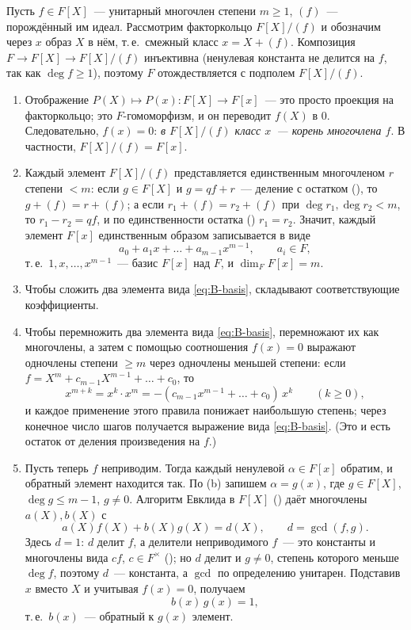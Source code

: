 Пусть $f\in F[X]$~--- унитарный многочлен степени $m\ge1$, $(f)$~--- порождённый им идеал. Рассмотрим факторкольцо
$F[X]/(f)$ и обозначим через $x$ образ $X$ в нём, т.\,е.\ смежный класс $x=X+(f)$. Композиция $F\to F[X]\to F[X]/(f)$
инъективна (ненулевая константа не делится на $f$, так как $\deg f\ge1$), поэтому $F$ отождествляется с подполем
$F[X]/(f)$.
\begin{enumerate}[label=(\alph*),leftmargin=*]
\item Отображение $P(X)\mapsto P(x)\colon F[X]\to F[x]$~--- это просто проекция на факторкольцо; это $F$-гомоморфизм, и
он переводит $f(X)$ в $0$. Следовательно, $f(x)=0$: \emph{в $F[X]/(f)$ класс $x$~--- корень многочлена $f$}. В
частности, $F[X]/(f)=F[x]$.
\item Каждый элемент $F[X]/(f)$ представляется единственным многочленом $r$ степени $<m$: если $g\in F[X]$ и $g=qf+r$~---
деление с остатком (), то $g+(f)=r+(f)$; а если $r_1+(f)=r_2+(f)$ при $\deg r_1,\deg r_2<m$, то $r_1-r_2=qf$, и по
единственности остатка () $r_1=r_2$. Значит, каждый элемент $F[x]$
единственным образом записывается в виде
\begin{equation}\label{eq:B-basis}
a_0+a_1x+\dots+a_{m-1}x^{m-1},\qquad a_i\in F,
\end{equation}
т.\,е.\ $1,x,\dots,x^{m-1}$~--- базис $F[x]$ над $F$, и $\dim_FF[x]=m$.
\item Чтобы сложить два элемента вида \eqref{eq:B-basis}, складывают соответствующие коэффициенты.
\item Чтобы перемножить два элемента вида \eqref{eq:B-basis}, перемножают их как многочлены, а затем с помощью
соотношения $f(x)=0$ выражают одночлены степени $\ge m$ через одночлены меньшей степени: если
$f=X^m+c_{m-1}X^{m-1}+\dots+c_0$, то
\[
x^{m+k}=x^k\cdot x^m=-(c_{m-1}x^{m-1}+\dots+c_0)\,x^k\qquad(k\ge0),
\]
и каждое применение этого правила понижает наибольшую степень; через конечное число шагов получается выражение вида
\eqref{eq:B-basis}. (Это и есть остаток от деления произведения на $f$.)
\item Пусть теперь $f$ неприводим. Тогда каждый ненулевой $\alpha\in F[x]$ обратим, и обратный элемент находится так.
По (b) запишем $\alpha=g(x)$, где $g\in F[X]$, $\deg g\le m-1$, $g\ne0$. Алгоритм Евклида в $F[X]$ () даёт многочлены
$a(X),b(X)$ с
\[
a(X)f(X)+b(X)g(X)=d(X),\qquad d=\gcd(f,g).
\]
Здесь $d=1$: $d$ делит $f$, а делители неприводимого $f$~--- это константы и многочлены вида $cf$, $c\in F^\times$
(); но $d$
делит и $g\ne0$, степень которого меньше $\deg f$, поэтому $d$~--- константа, а $\gcd$ по определению унитарен. Подставив
$x$ вместо $X$ и учитывая $f(x)=0$, получаем
\[
b(x)\,g(x)=1,
\]
т.\,е.\ $b(x)$~--- обратный к $g(x)$ элемент.
\end{enumerate}

